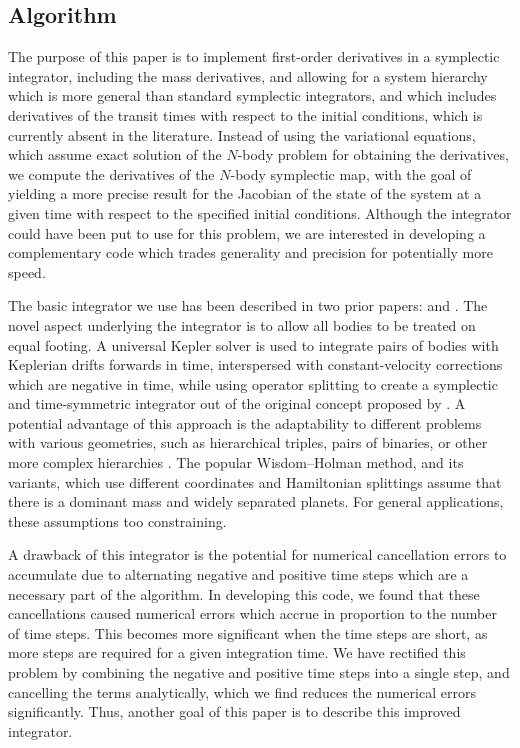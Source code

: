 \documentclass[fleqn,usenatbib,twocolumn]{mnras}
\newcommand   {\change}[1] {{\color{black}{#1}}}
\begin{document}
\subsection{Algorithm}

The purpose of this paper is to implement first-order derivatives
in a symplectic integrator, including the mass derivatives, and allowing
for a system hierarchy which is more general than standard symplectic integrators, and which includes derivatives of the transit times with respect to the initial conditions, which is currently absent in the literature.  Instead of using the variational equations,
which assume exact solution of the $N$-body problem for obtaining the derivatives,
we compute the derivatives of the $N$-body symplectic map, with the goal of yielding a more precise
result for the Jacobian of the state of the system at a given time with respect
to the specified initial conditions.
Although the \citet{Rein2016} integrator could have been put to use for this
problem, we are interested in developing a complementary code which trades
generality and precision for potentially more speed.

The basic integrator we use has been described in two prior papers:
\citet{Hernandez2015} and \citet{Dehnen2017}.  The novel aspect underlying the integrator is to allow all bodies to be treated on
equal footing.  A universal Kepler solver \citep{Wisdom2015} is used
to integrate pairs of bodies with Keplerian drifts forwards in time, interspersed with
constant-velocity corrections which are negative in time, while using operator
splitting to create a symplectic and time-symmetric integrator
out of the original concept proposed by \citet{GoncalvesFerrari2014}.
A potential advantage of this approach is the adaptability to different problems
with various geometries, such as hierarchical triples, pairs of binaries,
or other more complex hierarchies \citep{Hamers2016}.  The popular
Wisdom--Holman method, and its variants, which use different coordinates
and Hamiltonian splittings \citep{Hernandez2017} assume that there
is a dominant mass and widely separated planets.  For general applications, these
assumptions \change{can be} too constraining.

A drawback of this integrator is the potential for numerical cancellation errors
to accumulate due to alternating negative and positive time steps which
are a necessary part of the algorithm.  In developing this code, we found that
these cancellations caused numerical errors which accrue in proportion to the number of time steps.  This becomes more significant when the
time steps are short, as more steps are required for a given integration time.  We have rectified this problem by combining the
negative and positive time steps into a single step, and cancelling
the terms analytically, which we find reduces the numerical
errors significantly.  Thus, another goal of this paper is to describe this improved integrator.
\end{document}
